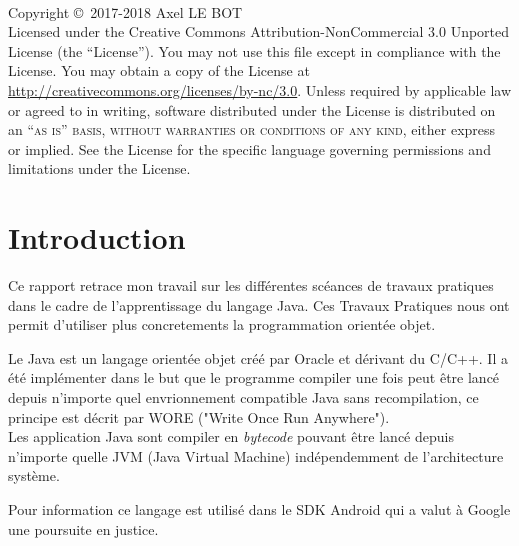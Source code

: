 \documentclass[12pt,a4paper]{book} %
\begin{document}
\newpage
~\vfill
\thispagestyle{empty}

\noindent Copyright \copyright\ 2017-2018 Axel LE BOT \\ %

\noindent Licensed under the Creative Commons Attribution-NonCommercial 3.0 Unported License (the ``License''). You may not use this file except in compliance with the License. You may obtain a copy of the License at \url{http://creativecommons.org/licenses/by-nc/3.0}. Unless required by applicable law or agreed to in writing, software distributed under the License is distributed on an \textsc{``as is'' basis, without warranties or conditions of any kind}, either express or implied. See the License for the specific language governing permissions and limitations under the License.\\ %


\pagestyle{empty} %


\chapter*{Introduction}

Ce rapport retrace mon travail sur les différentes scéances de travaux pratiques dans le cadre de l'apprentissage du langage Java. Ces Travaux Pratiques nous ont permit d'utiliser plus concretements la programmation orientée objet.

Le Java est un langage orientée objet créé par Oracle et dérivant du C/C++. Il a été implémenter dans le but que le programme compiler une fois peut être lancé depuis n'importe quel envrionnement compatible Java sans recompilation, ce principe est décrit par WORE ("Write Once Run Anywhere").\\
Les application Java sont compiler en \textit{bytecode} pouvant être lancé depuis n'importe quelle JVM (Java Virtual Machine) indépendemment de l'architecture système.

Pour information ce langage est utilisé dans le SDK Android qui a valut à Google une poursuite en justice.
\end{document}
